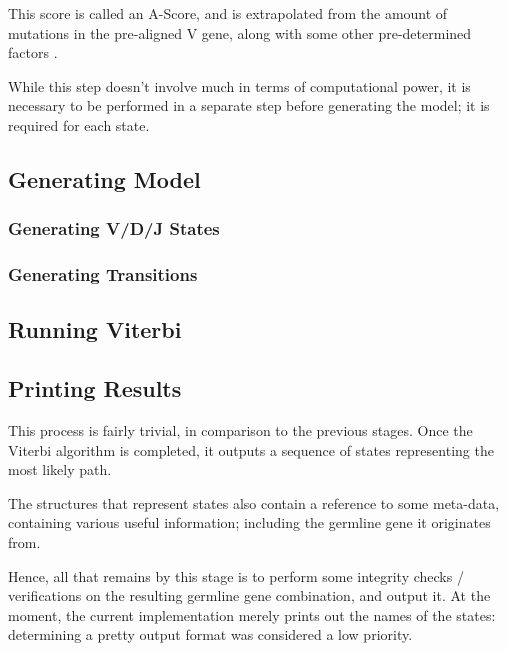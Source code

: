 This score is called an A-Score, and is extrapolated from the amount of mutations in the pre-aligned V gene, along with some other pre-determined factors \cite{iHMMuneAlign}.

While this step doesn't involve much in terms of computational power, it is necessary to be performed in a separate step before generating the model; it is required for each state. 

\subsection{Generating Model}
\label{sec:pipeline-stage_3}
\subsubsection{Generating V/D/J States}
\subsubsection{Generating Transitions}
\subsection{Running Viterbi}
\label{sec:pipeline-stage_4}

\subsection{Printing Results}
\label{sec:pipeline-stage_5}
This process is fairly trivial, in comparison to the previous stages. Once the Viterbi algorithm is completed, it outputs a sequence of states representing the most likely path.

The structures that represent states also contain a reference to some meta-data, containing various useful information; including the germline gene it originates from.

Hence, all that remains by this stage is to perform some integrity checks / verifications on the resulting germline gene combination, and output it. At the moment, the current implementation merely prints out the names of the states: determining a pretty output format was considered a low priority.


